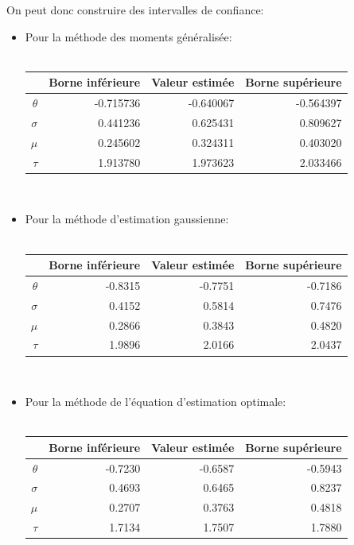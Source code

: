 On peut donc construire des intervalles de confiance:
\begin{itemize}
\item Pour la méthode des moments généralisée:\\ \\
  \begin{tabular}{rrrr}
    \hline
    & \textbf{Borne inférieure} & \textbf{Valeur estimée} & \textbf{Borne supérieure} \\
    \hline
    $\theta$ &  -0.715736& -0.640067& -0.564397\\
    $\sigma$ & 0.441236 & 0.625431 & 0.809627\\
    $\mu$ & 0.245602 & 0.324311 & 0.403020\\
    $\tau$ & 1.913780 & 1.973623 & 2.033466\\
    \hline
  \end{tabular} \\
\item Pour la méthode d'estimation gaussienne:\\ \\
  \begin{tabular}{rrrr}
    \hline
    & \textbf{Borne inférieure} & \textbf{Valeur estimée} & \textbf{Borne supérieure} \\
    \hline
    $\theta$ & -0.8315 & -0.7751 & -0.7186 \\ 
    $\sigma$ & 0.4152 & 0.5814 & 0.7476 \\ 
    $\mu$ & 0.2866 & 0.3843 & 0.4820 \\ 
    $\tau$ & 1.9896 & 2.0166 & 2.0437 \\ 
    \hline
  \end{tabular} \\
\item Pour la méthode de l'équation d'estimation optimale:\\ \\
  \begin{tabular}{rrrr}
    \hline
    & \textbf{Borne inférieure} & \textbf{Valeur estimée} & \textbf{Borne supérieure} \\
    \hline
    $\theta$ & -0.7230 & -0.6587 & -0.5943 \\ 
    $\sigma$ & 0.4693 & 0.6465 & 0.8237 \\ 
    $\mu$ & 0.2707 & 0.3763 & 0.4818 \\ 
    $\tau$ & 1.7134 & 1.7507 & 1.7880 \\ 
    \hline
  \end{tabular} \\

\end{itemize}
